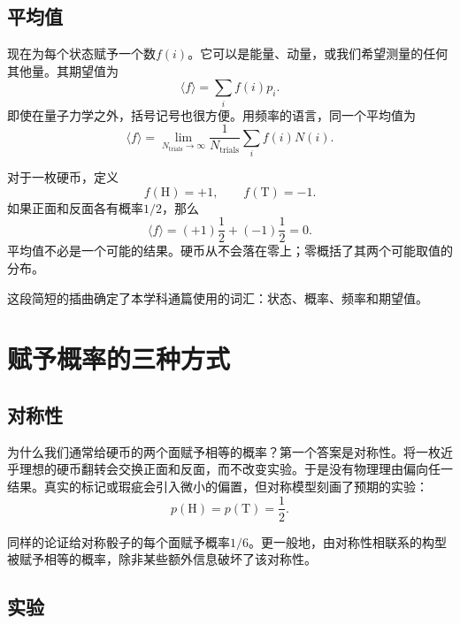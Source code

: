 \subsection{平均值}

现在为每个状态赋予一个数\(f(i)\)。它可以是能量、动量，或我们希望测量的任何其他量。其期望值为
\begin{equation}
 \langle f\rangle=\sum_i f(i)p_i.
 \label{eq:sm1-expectation}
\end{equation}
即使在量子力学之外，括号记号也很方便。用频率的语言，同一个平均值为
\begin{equation}
 \langle f\rangle
 =
 \lim_{N_{\mathrm{trials}}\to\infty}
 \frac{1}{N_{\mathrm{trials}}}
 \sum_i f(i)N(i).
 \label{eq:sm1-frequency-average}
\end{equation}

对于一枚硬币，定义
\begin{equation}
 f(\mathrm{H})=+1,
 \qquad
 f(\mathrm{T})=-1.
\end{equation}
如果正面和反面各有概率\(1/2\)，那么
\begin{equation}
 \langle f\rangle
 =(+1)\frac12+(-1)\frac12=0.
\end{equation}
平均值不必是一个可能的结果。硬币从不会落在零上；零概括了其两个可能取值的分布。

这段简短的插曲确定了本学科通篇使用的词汇：状态、概率、频率和期望值。

\section{赋予概率的三种方式}

\subsection{对称性}

为什么我们通常给硬币的两个面赋予相等的概率？第一个答案是对称性。将一枚近乎理想的硬币翻转会交换正面和反面，而不改变实验。于是没有物理理由偏向任一结果。真实的标记或瑕疵会引入微小的偏置，但对称模型刻画了预期的实验：
\begin{equation}
 p(\mathrm{H})=p(\mathrm{T})=\frac12.
\end{equation}

同样的论证给对称骰子的每个面赋予概率\(1/6\)。更一般地，由对称性相联系的构型被赋予相等的概率，除非某些额外信息破坏了该对称性。

\subsection{实验}

